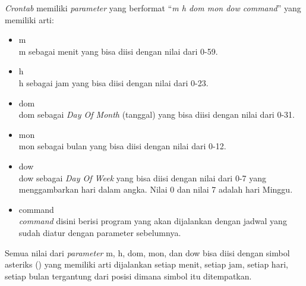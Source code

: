 \textit{Crontab} memiliki \textit{parameter} yang berformat ``\textit{m h dom mon dow command}'' yang memiliki arti:
\begin{itemize}
	\item m\\
	m sebagai menit yang bisa diisi dengan nilai dari 0-59. 
	\item h\\
	h sebagai jam yang bisa diisi dengan nilai dari 0-23.
	\item dom\\
	dom sebagai \textit{Day Of Month} (tanggal) yang bisa diisi dengan nilai dari 0-31.
	\item mon\\
	mon sebagai bulan yang bisa diisi dengan nilai dari 0-12.
	\item dow\\
	dow sebagai \textit{Day Of Week} yang bisa diisi dengan nilai dari 0-7 yang menggambarkan hari dalam angka. Nilai 0 dan nilai 7 adalah hari Minggu. 
	\item command\\
	\textit{command} disini berisi program yang akan dijalankan dengan jadwal yang sudah diatur dengan parameter sebelumnya. 
\end{itemize}

Semua nilai dari \textit{parameter} m, h, dom, mon, dan dow bisa diisi dengan simbol asteriks (\textbf{\*}) yang memiliki arti dijalankan setiap menit, setiap jam, setiap hari, setiap bulan tergantung dari posisi dimana simbol itu ditempatkan. 
 
